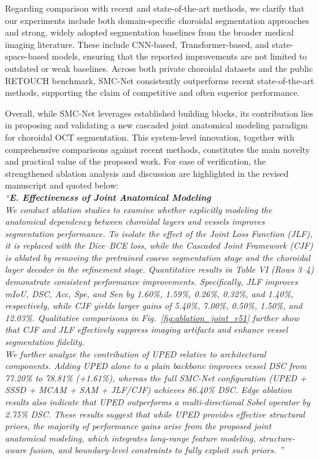 \documentclass[11pt]{article}
\begin{document}
\begin{enumerate}
{    Regarding comparison with recent and state-of-the-art methods, we clarify that our experiments include both domain-specific choroidal segmentation approaches and strong, widely adopted segmentation baselines from the broader medical imaging literature.
    These include CNN-based, Transformer-based, and state-space-based models, ensuring that the reported improvements are not limited to outdated or weak baselines.
    Across both private choroidal datasets and the public RETOUCH benchmark, SMC-Net consistently outperforms recent state-of-the-art methods, supporting the claim of competitive and often superior performance.
    
    Overall, while SMC-Net leverages established building blocks, its contribution lies in proposing and validating a new cascaded joint anatomical modeling paradigm for choroidal OCT segmentation.
    This system-level innovation, together with comprehensive comparisons against recent methods, constitutes the main novelty and practical value of the proposed work.
    For ease of verification, the strengthened ablation analysis and discussion are highlighted in the revised manuscript and quoted below:\\
    \textit{{\color{blue}``\textbf{E. Effectiveness of Joint Anatomical Modeling}\\
    We conduct ablation studies to examine whether explicitly modeling the anatomical dependency between choroidal layers and vessels improves segmentation performance.
    To isolate the effect of the Joint Loss Function (JLF), it is replaced with the Dice--BCE loss, while the Cascaded Joint Framework (CJF) is ablated by removing the pretrained coarse segmentation stage and the choroidal layer decoder in the refinement stage.
    Quantitative results in Table VI (Rows 3--4) demonstrate consistent performance improvements.
    Specifically, JLF improves mIoU, DSC, Acc, Spe, and Sen by 1.60\%, 1.59\%, 0.26\%, 0.32\%, and 1.40\%, respectively, while CJF yields larger gains of 5.40\%, 7.00\%, 0.50\%, 1.50\%, and 12.03\%.
    Qualitative comparisons in Fig.~\ref{fig:ablation_joint_r51} further show that CJF and JLF effectively suppress imaging artifacts and enhance vessel segmentation fidelity.\\
    We further analyze the contribution of UPED relative to architectural components.
    Adding UPED alone to a plain backbone improves vessel DSC from 77.20\% to 78.81\% (+1.61\%), whereas the full SMC-Net configuration (UPED + SSSD + MCAM + SAM + JLF/CJF) achieves 86.40\% DSC.
    Edge ablation results also indicate that UPED outperforms a multi-directional Sobel operator by 2.75\% DSC.
    These results suggest that while UPED provides effective structural priors, the majority of performance gains arise from the proposed joint anatomical modeling, which integrates long-range feature modeling, structure-aware fusion, and boundary-level constraints to fully exploit such priors.
    ''}}
    }\\


\end{enumerate}
\end{document}
